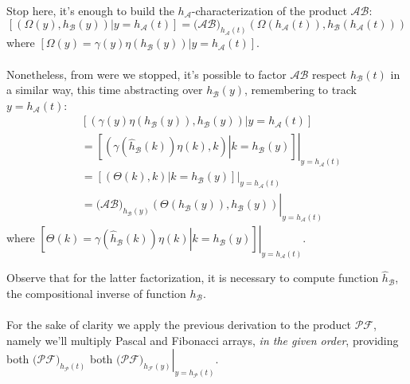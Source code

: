 Stop here, it's enough to build the $h_{\mathcal{A}}$-characterization 
of the product $\mathcal{A}\mathcal{B}$:
\begin{displaymath}
        \left[\left.\left(\Omega(y), h_{\mathcal{B}}(y)  \right) \right| y=h_{\mathcal{A}}(t) \right] 
        =\big(\mathcal{A}\mathcal{B}\big)_{h_{\mathcal{A}}(t)}\left(
            \Omega(h_{\mathcal{A}}(t)), h_{\mathcal{B}}(h_{\mathcal{A}}(t))  \right)
\end{displaymath}
where $\left[\left.\Omega(y)= \gamma(y)\eta(h_{\mathcal{B}}(y))\right| y=h_{\mathcal{A}}(t) \right]$. 
\\\\
Nonetheless, 
from were we stopped, it's possible to factor $\mathcal{A}\mathcal{B}$ respect $h_{\mathcal{B}}(t)$ in
a similar way, this time abstracting over $h_{\mathcal{B}}(y)$, remembering to track $y=h_{\mathcal{A}}(t)$:
\begin{displaymath}
    \begin{split}
        &\left[\left.\left(\gamma(y)\eta(h_{\mathcal{B}}(y)), h_{\mathcal{B}}(y)  \right) \right|
             y=h_{\mathcal{A}}(t) \right]\\
        &=\left.\left[\left.\left(\gamma(\hat{h}_{\mathcal{B}}(k))\eta(k), k  \right) \right|
             k=h_{\mathcal{B}}(y) \right]\right|_{y=h_{\mathcal{A}}(t)}\\
        &=\left.\left[\left.\left(\Theta(k), k  \right) \right| k=h_{\mathcal{B}}(y) \right]\right|_{y=h_{\mathcal{A}}(t)}\\
        &=\left.\big(\mathcal{A}\mathcal{B}\big)_{h_{\mathcal{B}}(y)}\left(
            \Theta(h_{\mathcal{B}}(y)), h_{\mathcal{B}}(y)  \right)\right|_{y=h_{\mathcal{A}}(t)}
    \end{split}
\end{displaymath}
where $\left.\left[\left.\Theta(k)=\gamma(\hat{h}_{\mathcal{B}}(k))\eta(k) \right| 
    k=h_{\mathcal{B}}(y) \right]\right|_{y=h_{\mathcal{A}}(t)}$.

Observe that for the latter factorization, it is necessary to compute function $\hat{h}_{\mathcal{B}}$, 
the compositional inverse of function $h_{\mathcal{B}}$.
\\\\
For the sake of clarity we apply the previous derivation to the product $\mathcal{P}\mathcal{F}$, namely
we'll multiply Pascal and Fibonacci arrays, \emph{in the given order}, providing 
both $\big(\mathcal{P}\mathcal{F}\big)_{h_{\mathcal{P}}(t)}$ 
both $\left.\big(\mathcal{P}\mathcal{F}\big)_{h_{\mathcal{F}}(y)}\right|_{y=h_{\mathcal{P}}(t)}$.

